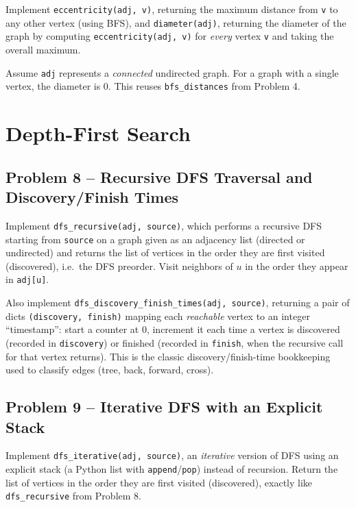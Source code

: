 \documentclass[11pt]{article}
\begin{document}
Implement \texttt{eccentricity(adj, v)}, returning the maximum distance from \texttt{v}
to any other vertex (using BFS), and \texttt{diameter(adj)}, returning the diameter of the
graph by computing \texttt{eccentricity(adj, v)} for \emph{every} vertex \texttt{v} and
taking the overall maximum.

Assume \texttt{adj} represents a \emph{connected} undirected graph. For a graph with a
single vertex, the diameter is 0. This reuses \texttt{bfs\_distances} from Problem 4.

\newpage
\section{Depth-First Search}

\subsection*{Problem 8 -- Recursive DFS Traversal and Discovery/Finish Times}

Implement \texttt{dfs\_recursive(adj, source)}, which performs a recursive DFS starting
from \texttt{source} on a graph given as an adjacency list (directed or undirected) and
returns the list of vertices in the order they are first visited (discovered), i.e.\ the
DFS preorder. Visit neighbors of $u$ in the order they appear in \texttt{adj[u]}.

Also implement \texttt{dfs\_discovery\_finish\_times(adj, source)}, returning a pair of
dicts \texttt{(discovery, finish)} mapping each \emph{reachable} vertex to an integer
``timestamp'': start a counter at 0, increment it each time a vertex is discovered
(recorded in \texttt{discovery}) or finished (recorded in \texttt{finish}, when the
recursive call for that vertex returns). This is the classic discovery/finish-time
bookkeeping used to classify edges (tree, back, forward, cross).

\subsection*{Problem 9 -- Iterative DFS with an Explicit Stack}

Implement \texttt{dfs\_iterative(adj, source)}, an \emph{iterative} version of DFS using
an explicit stack (a Python list with \texttt{append}/\texttt{pop}) instead of recursion.
Return the list of vertices in the order they are first visited (discovered), exactly
like \texttt{dfs\_recursive} from Problem 8.
\end{document}
